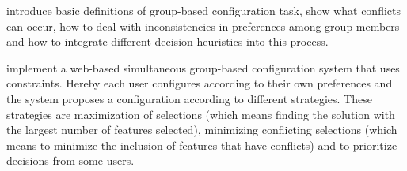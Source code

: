 \begin{description}[style=unboxed, leftmargin=0cm, font=\normalfont]
    \item[\citeauthor{felferningGroupBasedConfiguration2016} \cite{felferningGroupBasedConfiguration2016}] introduce basic definitions of group-based configuration task, show what conflicts can occur, how to deal with inconsistencies in preferences among group members and how to integrate different decision heuristics into this process.

    \item[\citeauthor{velasquez-guevaraMultiSPLOTSupportingMultiuser2018} \cite{velasquez-guevaraMultiSPLOTSupportingMultiuser2018}] implement a web-based simultaneous group-based configuration system that uses constraints. Hereby each user configures according to their own preferences and the system proposes a configuration according to different strategies. These strategies are maximization of selections (which means finding the solution with the largest number of features selected), minimizing conflicting selections (which means to minimize the inclusion of features that have conflicts) and to prioritize decisions from some users.
\end{description}

